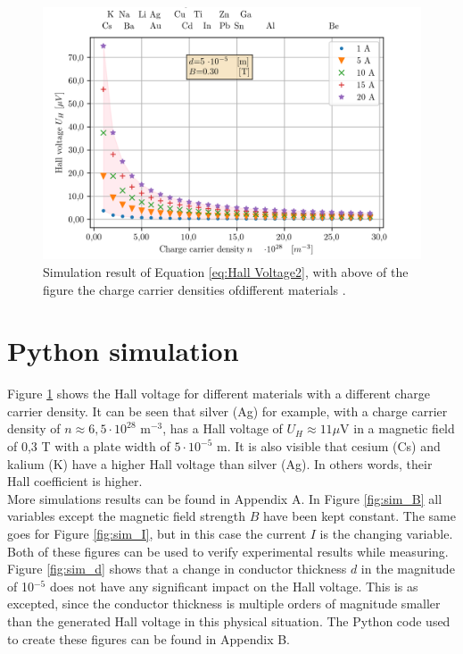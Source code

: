     \begin{figure}[!htbp]
    \begin{center}
    \includegraphics[scale=0.85]{figuren/simulatie/n.png}
    \end{center}
    \caption{Simulation result of Equation \ref{eq:Hall Voltage2}, with above of the figure the charge carrier densities ofdifferent materials \cite{ccdensity}.} \label{fig:sim_n}
    \end{figure}

\section{Python simulation}
Figure \ref{fig:sim_n} shows the Hall voltage for different materials with a different charge carrier density. It can be seen that silver (Ag) for example, with a charge carrier density  of $n \approx 6,5\cdot 10^{28}$ m$^{-3}$, has a Hall voltage of $U_H \approx 11 \mu$V in a magnetic field of 0,3 T with a plate width of $5 \cdot 10^{-5}$ m. It is also visible that cesium (Cs) and kalium (K) have a higher Hall voltage than silver (Ag). In others words, their Hall coefficient is higher. \\
More simulations results can be found in Appendix A. In Figure \ref{fig:sim_B} all variables except the magnetic field strength $B$ have been kept constant. The same goes for Figure \ref{fig:sim_I}, but in this case the current $I$ is the changing variable. Both of these figures can be used to verify experimental results while measuring. Figure \ref{fig:sim_d} shows that a change in conductor thickness $d$ in the magnitude of 10$^{-5}$ does not have any significant impact on the Hall voltage. This is as excepted, since the conductor thickness is multiple orders of magnitude smaller than the generated Hall voltage in this physical situation. The Python code used to create these figures can be found in Appendix B.